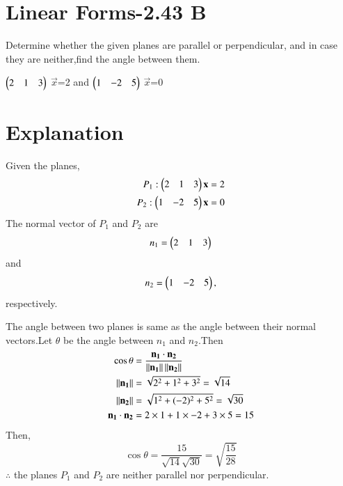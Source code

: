 \documentclass[journal,12pt,twocolumn]{IEEEtran}
\begin{document}
\section{Linear Forms-2.43 B}
Determine whether the given planes are parallel or perpendicular, and in case they are neither,find the angle between them.

$\begin{pmatrix}2&1&3\end{pmatrix}$ $\vec x$=2  and $\begin{pmatrix}1&-2&5\end{pmatrix}$ $\vec{x}$=0
\section{Explanation}
Given the planes,
\begin{align}
P_1:\begin{pmatrix}2&1&3\end{pmatrix}\mathbf{x}&=2 \\
P_2 :\begin{pmatrix}1&-2&5\end{pmatrix} \mathbf{x}&=0
\end{align}
The normal vector of $P_1$ and $P_2$ are 
\begin{equation}
 n_1=\begin{pmatrix}2&1&3\end{pmatrix} \end{equation}and
 \begin{equation}
 n_2 =\begin{pmatrix}1&-2&5\end{pmatrix},
\end{equation} respectively.

The angle between two planes is same as the angle between their normal vectors.Let $\theta$ be the angle between $n_1$ and $n_2$.Then
\begin{align}
    \cos\theta &= \frac{\mathbf{n_1}\cdot\mathbf{n_2}}{\left\lVert\mathbf{n_1}\right\rVert\left\lVert\mathbf{n_2}\right\rVert}\\
    \left\lVert\mathbf{n_1}\right\rVert&=\sqrt{2^2+1^2+3^2}=\sqrt{14}\\
    \left\lVert\mathbf{n_2}\right\rVert&=\sqrt{1^2+(-2)^2+5^2}=\sqrt{30}\\
    \mathbf{n_1}\cdot\mathbf{n_2}&=2\times1+1\times{-2}+3\times5=15
\end{align}
Then,\begin{equation}
    \cos{\theta}=\frac{15}{\sqrt{14}\sqrt{30}}=\sqrt{\frac{15}{28}}
\end{equation} \label{eq1}
$\therefore$ the planes $P_1$ and $P_2$ are neither parallel nor perpendicular.
\end{document}

